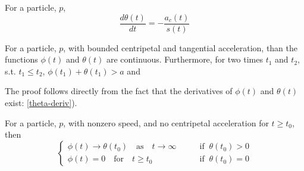 \begin{lemma}\label{theta-deriv}
  For a particle, $p$,
  \[
  \frac{d\theta(t)}{dt} = -\frac{a_c(t)}{s(t)}
  \]
\end{lemma}

\begin{lemma}
  For a particle, $p$, with bounded centripetal and tangential acceleration, than the functions $\phi(t)$ and $\theta(t)$ are continuous. Furthermore, for two times $t_1$ and $t_2$, s.t. $t_1 \le t_2$, $\phi(t_1) + \theta(t_1) > a$ and  
\end{lemma}

\proof

The proof follows directly from the fact that the derivatives of $\phi(t)$ and $\theta(t)$ exist: \ref{theta-deriv}).

\begin{lemma}
  For a particle, $p$, with nonzero speed, and no centripetal acceleration for $t \ge t_0$, then
  \[
    \begin{cases}
      \phi(t) \to \theta(t_0) \quad \text{as} \quad t \to \infty \qquad &\text{if} \;\; \theta(t_0) > 0\\
      \phi(t) = 0 \quad \text{for} \quad t \ge t_0 \qquad &\text{if} \;\; \theta(t_0) = 0
    \end{cases}
  \]
\end{lemma}